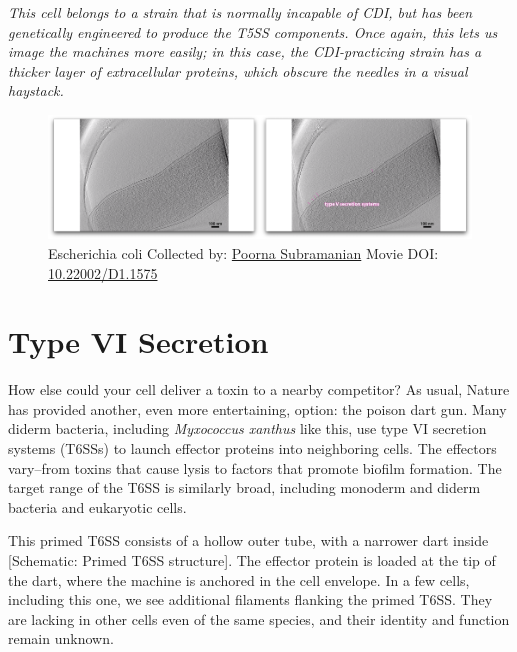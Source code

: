 \documentclass[]{tufte-book}
\begin{document}
\emph{This cell belongs to a strain that is normally incapable of CDI,
but has been genetically engineered to produce the T5SS components. Once
again, this lets us image the machines more easily; in this case, the
CDI-practicing strain has a thicker layer of extracellular proteins,
which obscure the needles in a visual haystack.}





\begin{figure}
\includegraphics{movie_stills/9_5} \caption[Escherichia coli Collected by:
\protect\hyperlink{poorna_subramanian}{Poorna Subramanian} Movie DOI:
\href{https://doi.org/10.22002/D1.1575}{10.22002/D1.1575}]{Escherichia coli Collected by:
\protect\hyperlink{poorna_subramanian}{Poorna Subramanian} Movie DOI:
\href{https://doi.org/10.22002/D1.1575}{10.22002/D1.1575}}\label{fig:9-5}
\end{figure}

\section{Type VI Secretion}\label{type-vi-secretion}

How else could your cell deliver a toxin to a nearby competitor? As
usual, Nature has provided another, even more entertaining, option: the
poison dart gun. Many diderm bacteria, including \emph{Myxococcus
xanthus} like this, use type VI secretion systems (T6SSs) to launch
effector proteins into neighboring cells. The effectors vary--from
toxins that cause lysis to factors that promote biofilm formation. The
target range of the T6SS is similarly broad, including monoderm and
diderm bacteria and eukaryotic cells.

This primed T6SS consists of a hollow outer tube, with a narrower dart
inside {[}Schematic: Primed T6SS structure{]}. The effector protein is
loaded at the tip of the dart, where the machine is anchored in the cell
envelope. In a few cells, including this one, we see additional
filaments flanking the primed T6SS. They are lacking in other cells even
of the same species, and their identity and function remain unknown.
\end{document}

